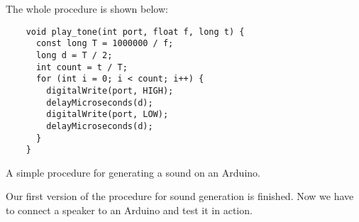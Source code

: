 \documentclass[../sparc.tex]{subfiles}
\begin{document}
The whole procedure is shown below:
\begin{listing}[H]
  \begin{verbatim}
    void play_tone(int port, float f, long t) {
      const long T = 1000000 / f;
      long d = T / 2;
      int count = t / T;
      for (int i = 0; i < count; i++) {
        digitalWrite(port, HIGH);
        delayMicroseconds(d);
        digitalWrite(port, LOW);
        delayMicroseconds(d);
      }
    }
  \end{verbatim}
  \label{listing:play-tone-procedure}
  \caption{A simple procedure for generating a sound on an Arduino.}
\end{listing}

Our first version of the procedure for sound generation is finished.  Now we
have to connect a speaker to an Arduino and test it in action.

\end{document}
